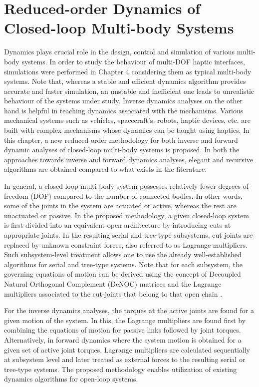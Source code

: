 \chapter{Reduced-order Dynamics of Closed-loop Multi-body Systems}
Dynamics plays crucial role in the design, control and simulation of various multi-body systems. In order to study the behaviour of multi-DOF haptic interfaces, simulations were performed in Chapter 4 considering them as typical multi-body systems. Note that, whereas a stable and efficient dynamics algorithm provides accurate and faster simulation, an unstable and inefficient one leads to unrealistic behaviour of the systems under study. Inverse dynamics analyses on the other hand is helpful in teaching dynamics associated with the mechanisms. Various mechanical systems such as vehicles, spacecraft's, robots, haptic devices, etc. are built with complex mechanisms whose dynamics can be taught using haptics. In this chapter, a new reduced-order methodology for both inverse and forward dynamic analyses of closed-loop multi-body systems is proposed. In both the approaches towards inverse and forward dynamics analyses, elegant and recursive algorithms are obtained compared to what exists in the literature. 

In general, a closed-loop multi-body system possesses relatively fewer degrees-of-freedom (DOF) compared to the number of connected bodies. In other words, some of the joints in the system are actuated or active, whereas the rest are unactuated or passive. In the proposed methodology, a given closed-loop system is first divided into an equivalent open architecture by introducing cuts at appropriate joints. In the resulting serial and tree-type subsystems, cut joints are replaced by unknown constraint forces, also referred to as Lagrange multipliers. Such subsystem-level treatment allows one to use the already well-established algorithms for serial and tree-type systems. Note that for each subsystem, the governing equations of motion can be derived using the concept of Decoupled Natural Orthogonal Complement (DeNOC) matrices and the Lagrange multipliers associated to the cut-joints that belong to that open chain \citep{chaudhary2008dynamics,shah2013dynamics}.

For the inverse dynamics analyses, the torques at the active joints are found for a given motion of the system. In this, the Lagrange multipliers are found first by combining the equations of motion for passive links followed by joint torques. Alternatively, in forward dynamics where the system motion is obtained for a given set of active joint torques, Lagrange multipliers are calculated sequentially at subsystem level and later treated as external forces to the resulting serial or tree-type systems. The proposed methodology enables utilization of existing dynamics algorithms for open-loop systems.


